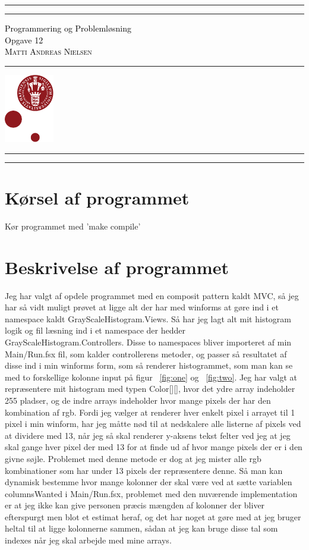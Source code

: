 \documentclass[a4paper]{article}
\newcommand*{\titleAT}{\begingroup %
\newlength{\drop} %
\drop=0.1\textheight %

\rule{\textwidth}{1pt}\par %
\vspace{2pt}\vspace{-\baselineskip} %
\rule{\textwidth}{0.4pt}\par %

\vspace{\drop} %
\centering %
\textcolor{Black}{ %
{\Huge Programmering og Problemløsning}\\[0.5\baselineskip] %
{\Large Opgave 12}\\[0.75\baselineskip] %
{\Huge \textsc{Matti Andreas Nielsen}}}\par %

\vspace{0.25\drop} %
\rule{0.3\textwidth}{0.4pt}\par %
\vspace{\drop} %

\vfill %
{\large \includegraphics[height=30mm]{KULogo}}

\vspace*{\drop} %

\rule{\textwidth}{0.4pt}\par %
\vspace{2pt}\vspace{-\baselineskip} %
\rule{\textwidth}{1pt}\par %

\endgroup}
\begin{document}
\titleAT %

\newpage
\tableofcontents
\newpage
\section{Kørsel af programmet}

Kør programmet med 'make compile'

\section{Beskrivelse af programmet}

Jeg har valgt af opdele programmet med en composit pattern kaldt MVC, så jeg har så vidt muligt prøvet at ligge alt der har med winforms at gøre ind i et namespace
kaldt GrayScaleHistogram.Views. Så har jeg lagt alt mit histogram logik og fil læsning ind i et namespace der hedder GrayScaleHistogram.Controllers.
Disse to namespaces bliver importeret af min Main/Run.fsx fil, som kalder controllerens metoder, og passer så resultatet af disse ind i min winforms form, som så
renderer histogrammet, som man kan se med to forskellige kolonne input på figur ~\ref{fig:one} og ~\ref{fig:two}. 
Jeg har valgt at repræsentere mit histogram med typen Color[][], hvor det ydre array indeholder 255 pladser, og de indre arrays indeholder hvor mange pixels der har den kombination 
af rgb. Fordi jeg vælger at renderer hver enkelt pixel i arrayet til 1 pixel i min winform, har jeg måtte nød til at nedskalere alle listerne af pixels ved at dividere med 13, når jeg så 
skal renderer y-aksens tekst felter ved jeg at jeg skal gange hver pixel der med 13 for at finde ud af hvor mange pixels der er i den givne søjle. Problemet med denne metode er dog at jeg 
mister alle rgb kombinationer som har under 13 pixels der repræsentere denne. Så man kan dynamisk bestemme hvor mange kolonner der skal være ved at sætte variablen columnsWanted i Main/Run.fsx,
problemet med den nuværende implementation er at jeg ikke kan give personen præcis mængden af kolonner der bliver efterspurgt men blot et estimat heraf, og det har noget at gøre med at jeg bruger
heltal til at ligge kolonnerne sammen, sådan at jeg kan bruge disse tal som indexes når jeg skal arbejde med mine arrays. 
\end{document}

